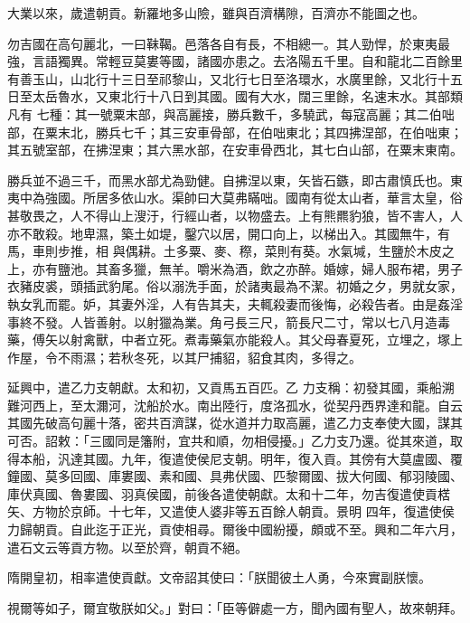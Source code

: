 \begin{pinyinscope}
 大業以來，歲遣朝貢。新羅地多山險，雖與百濟構隙，百濟亦不能圖之也。



 勿吉國在高句麗北，一曰靺鞨。邑落各自有長，不相總一。其人勁悍，於東夷最強，言語獨異。常輕豆莫婁等國，諸國亦患之。去洛陽五千里。自和龍北二百餘里有善玉山，山北行十三日至祁黎山，又北行七日至洛環水，水廣里餘，又北行十五日至太岳魯水，又東北行十八日到其國。國有大水，闊三里餘，名速末水。其部類凡有
 七種：其一號粟末部，與高麗接，勝兵數千，多驍武，每寇高麗；其二伯咄部，在粟末北，勝兵七千；其三安車骨部，在伯咄東北；其四拂涅部，在伯咄東；其五號室部，在拂涅東；其六黑水部，在安車骨西北，其七白山部，在粟末東南。



 勝兵並不過三千，而黑水部尤為勁健。自拂涅以東，矢皆石鏃，即古肅慎氏也。東夷中為強國。所居多依山水。渠帥曰大莫弗瞞咄。國南有從太山者，華言太皇，俗甚敬畏之，人不得山上溲汙，行經山者，以物盛去。上有熊羆豹狼，皆不害人，人亦不敢殺。地卑濕，築土如堤，鑿穴以居，開口向上，以梯出入。其國無牛，有馬，車則步推，相
 與偶耕。土多粟、麥、穄，菜則有葵。水氣堿，生鹽於木皮之上，亦有鹽池。其畜多獵，無羊。嚼米為酒，飲之亦醉。婚嫁，婦人服布裙，男子衣豬皮裘，頭插武豹尾。俗以溺洗手面，於諸夷最為不潔。初婚之夕，男就女家，執女乳而罷。妒，其妻外淫，人有告其夫，夫輒殺妻而後悔，必殺告者。由是姦淫事終不發。人皆善射。以射獵為業。角弓長三尺，箭長尺二寸，常以七八月造毒藥，傅矢以射禽獸，中者立死。煮毒藥氣亦能殺人。其父母春夏死，立埋之，塚上作屋，令不雨濕；若秋冬死，以其尸捕貂，貂食其肉，多得之。



 延興中，遣乙力支朝獻。太和初，又貢馬五百匹。乙
 力支稱：初發其國，乘船溯難河西上，至太濔河，沈船於水。南出陸行，度洛孤水，從契丹西界達和龍。自云其國先破高句麗十落，密共百濟謀，從水道并力取高麗，遣乙力支奉使大國，謀其可否。詔敕：「三國同是籓附，宜共和順，勿相侵擾。」乙力支乃還。從其來道，取得本船，汎達其國。九年，復遣使侯尼支朝。明年，復入貢。其傍有大莫盧國、覆鐘國、莫多回國、庫婁國、素和國、具弗伏國、匹黎爾國、拔大何國、郁羽陵國、庫伏真國、魯婁國、羽真侯國，前後各遣使朝獻。太和十二年，勿吉復遣使貢楛矢、方物於京師。十七年，又遣使人婆非等五百餘人朝貢。景明
 四年，復遣使侯力歸朝貢。自此迄于正光，貢使相尋。爾後中國紛擾，頗或不至。興和二年六月，遣石文云等貢方物。以至於齊，朝貢不絕。



 隋開皇初，相率遣使貢獻。文帝詔其使曰：「朕聞彼土人勇，今來實副朕懷。



 視爾等如子，爾宜敬朕如父。」對曰：「臣等僻處一方，聞內國有聖人，故來朝拜。




\end{pinyinscope}
